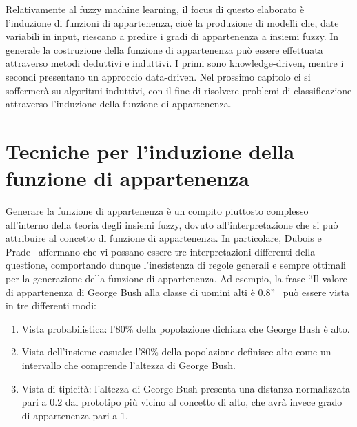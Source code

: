 \documentclass[11pt,  oneside, openany]{book}
\begin{document}
Relativamente al fuzzy machine learning, il focus di questo elaborato è l'induzione di funzioni di appartenenza, cioè la produzione di modelli che, date variabili in input, riescano a predire i gradi di appartenenza a insiemi fuzzy. In generale la costruzione della funzione di appartenenza può essere effettuata attraverso metodi deduttivi e induttivi. I primi sono knowledge-driven, mentre i secondi presentano un approccio data-driven. Nel prossimo capitolo ci si soffermerà su algoritmi induttivi, con il fine di risolvere problemi di classificazione attraverso l'induzione della funzione di appartenenza. 


	\newpage
	\chapter{Tecniche per l'induzione della funzione di appartenenza}

Generare la funzione di appartenenza è un compito piuttosto complesso all'interno della teoria degli insiemi fuzzy, dovuto all'interpretazione che si può attribuire al concetto di funzione di appartenenza. In particolare, Dubois e Prade~\cite{membinterp} affermano che vi possano essere tre interpretazioni differenti della questione, comportando dunque l'inesistenza di regole generali e sempre ottimali per la generazione della funzione di appartenenza. Ad esempio, la frase ``Il valore di appartenenza di George Bush alla classe di uomini alti è 0.8''~\cite{membpaper} può essere vista in tre differenti modi:

\begin{enumerate}
\item Vista probabilistica: l'80\% della popolazione dichiara che George Bush è alto.
\item Vista dell'insieme casuale: l'80\% della popolazione definisce alto come un intervallo che comprende l'altezza di George Bush.
\item Vista di tipicità: l'altezza di George Bush presenta una distanza normalizzata pari a 0.2 dal prototipo più vicino al concetto di alto, che avrà invece grado di appartenenza pari a 1. 
\end{enumerate}
\end{document}
